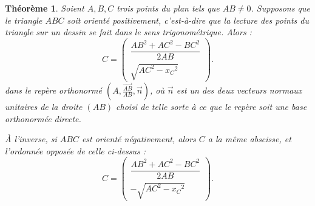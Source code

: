 \documentclass[french, a4paper, 12pt, parskip]{scrartcl}
\newtheorem{theorem}{Théorème}
\begin{document}
\begin{theorem}
  \label{th:base-plan}
  Soient $A, B, C$ trois points du plan tels que $AB\not=0$. Supposons que le
  triangle $ABC$ soit orienté positivement, c'est-à-dire que la lecture des
  points du triangle sur un dessin se fait dans le sens trigonométrique. Alors
  :
  \[
    C = \begin{pmatrix}
      \dfrac{{AB}^2 + {AC}^2 - {BC}^2}{2AB} \\[4mm]
      \sqrt{{AC}^2 - {x_C}^2}
    \end{pmatrix}.
  \]
  dans le repère orthonormé $\left(A, \frac{\overrightarrow{AB}}{AB},
  \overrightarrow{n}\right)$, où $\overrightarrow{n}$ est un des deux vecteurs
  normaux unitaires de la droite $(AB)$ choisi de telle sorte à ce que le
  repère soit une base orthonormée directe.

  À l'inverse, si $ABC$ est orienté négativement, alors $C$ a la même abscisse,
  et l'ordonnée opposée de celle ci-dessus :
  \[
    C = \begin{pmatrix}
      \dfrac{{AB}^2 + {AC}^2 - {BC}^2}{2AB} \\[4mm]
      -\sqrt{{AC}^2 - {x_C}^2}
    \end{pmatrix}.
  \]

  \begin{center}
  \end{center}
\end{theorem}
\end{document}
